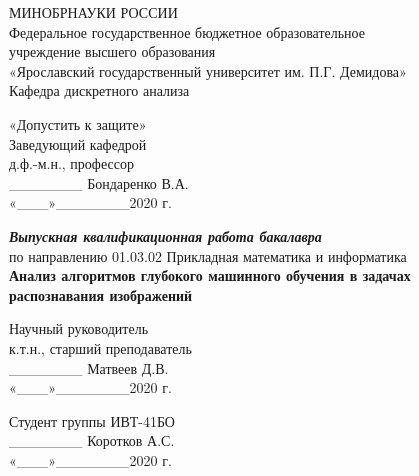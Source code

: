 \begin{titlepage}
  \begin{center}  
    МИНОБРНАУКИ   РОССИИ\\  
    Федеральное государственное бюджетное образовательное\\
    учреждение высшего образования\\  
    «Ярославский государственный университет им. П.Г. Демидова»\\  
    \vspace{1cm}
    Кафедра дискретного анализа
  \end{center}
  \vspace{1cm}
  \begin{flushright}
    «Допустить к защите»\\
    Заведующий кафедрой\\
    д.ф.-м.н., профессор\\
    \_\_\_\_\_\_\_ Бондаренко В.А.\\
    «\_\_\_»\_\_\_\_\_\_\_2020 г.
  \end{flushright}
  \vspace{1cm}
  \begin{center}
    \textbf{\textit{Выпускная квалификационная работа бакалавра}}\\
    по направлению 01.03.02 Прикладная математика и информатика\\
    \vspace{1cm}
    \textbf{Анализ алгоритмов глубокого машинного обучения в задачах \\ распознавания изображений}
  \end{center}
  \vspace{1cm}
  \begin{flushright}
    Научный руководитель\\
    к.т.н., старший преподаватель\\
    \_\_\_\_\_\_\_ Матвеев Д.В.\\
    «\_\_\_»\_\_\_\_\_\_\_2020 г.
  \end{flushright}
  \begin{flushright}
      Студент группы ИВТ-41БО\\
      \_\_\_\_\_\_\_ Коротков А.С.\\
      «\_\_\_»\_\_\_\_\_\_\_2020 г.
  \end{flushright}
  \vfill
\end{titlepage}
\clearpage